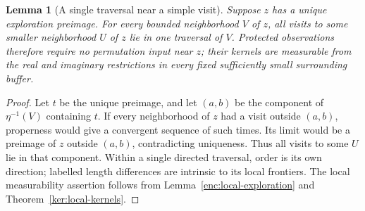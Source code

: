 \documentclass[11pt]{article}
\numberwithin{equation}{section}
\newtheorem{lemma}[theorem]{Lemma}
\theoremstyle{definition}
\theoremstyle{remark}
\newcommand{\1}{\mathbf 1}
\begin{document}
\begin{lemma}[A single traversal near a simple visit]\label{ker:single-traversal}
Suppose \(z\) has a unique exploration preimage.  For every bounded
neighborhood \(V\) of \(z\), all visits to some smaller neighborhood
\(U\) of \(z\) lie in one traversal of \(V\).  Protected observations
therefore require no permutation input near \(z\); their kernels
are measurable from the real and imaginary restrictions in every
fixed sufficiently small surrounding buffer.
\end{lemma}

\begin{proof}
Let \(t\) be the unique preimage, and let \((a,b)\) be the component
of \(\eta^{-1}(V)\) containing \(t\).  If every neighborhood of \(z\)
had a visit outside \((a,b)\), properness would give a convergent
sequence of such times.  Its limit would be a preimage of \(z\)
outside \((a,b)\), contradicting uniqueness.  Thus all visits to
some \(U\) lie in that component.  Within a single directed traversal,
order is its own direction; labelled length differences are intrinsic
to its local frontiers.  The local measurability assertion follows
from Lemma~\ref{enc:local-exploration} and
Theorem~\ref{ker:local-kernels}.
\end{proof}
\end{document}
